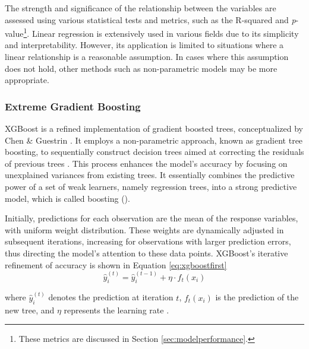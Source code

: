 The strength and significance of the relationship between the variables are assessed using various statistical tests and metrics, such as the R-squared and \textit{p}-value\footnote{These metrics are discussed in Section \ref{sec:modelperformance}.}. Linear regression is extensively used in various fields due to its simplicity and interpretability. However, its application is limited to situations where a linear relationship is a reasonable assumption. In cases where this assumption does not hold, other methods such as non-parametric models may be more appropriate.


\subsubsection{Extreme Gradient Boosting}

XGBoost is a refined implementation of gradient boosted trees, conceptualized by Chen \& Guestrin \parencite*{Chen:2016:XST:2939672.2939785}. It employs a non-parametric approach, known as gradient tree boosting, to sequentially construct decision trees aimed at correcting the residuals of previous trees \parencite{witten2013introduction}. This process enhances the model's accuracy by focusing on unexplained variances from existing trees. It essentially combines the predictive power of a set of weak learners, namely regression trees, into a strong predictive model, which is called boosting (\cite{SUTTON2005303}).

Initially, predictions for each observation are the mean of the response variables, with uniform weight distribution. These weights are dynamically adjusted in subsequent iterations, increasing for observations with larger prediction errors, thus directing the model's attention to these data points. XGBoost's iterative refinement of accuracy is shown in Equation \ref{eq:xgboostfirst}
\begin{equation}
\label{eq:xgboostfirst}
\hat{y}_i^{(t)} = \hat{y}_i^{(t-1)} + \eta \cdot f_t(x_i)
\end{equation}

where $\hat{y}_i^{(t)}$ denotes the prediction at iteration $t$, $f_t(x_i)$ is the prediction of the new tree, and $\eta$ represents the learning rate \parencite{Chen:2016:XST:2939672.2939785}.

